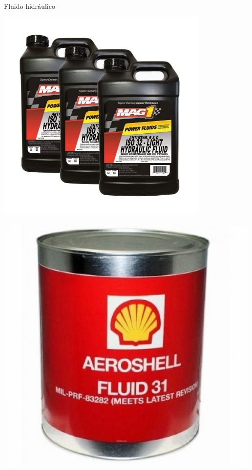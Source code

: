 \begin{frame}{Fluido hidráulico}
	\begin{minipage}{.45\linewidth}
		\centering
		\includegraphics[width=1\linewidth]{Figuras/Ch15/fig13}
	\end{minipage}
	\hfill
	\begin{minipage}{.45\linewidth}
		\centering
		\includegraphics[width=1\linewidth]{Figuras/Ch15/fig14}
	\end{minipage}
\end{frame}


